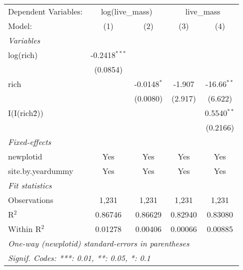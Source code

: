 \begin{tabular}{lcccc}
\tabularnewline\midrule\midrule
Dependent Variables:&\multicolumn{2}{c}{log(live\_mass)}&\multicolumn{2}{c}{live\_mass}\\
Model:&(1) & (2) & (3) & (4)\\
\midrule \emph{Variables}&   &   &   &  \\
log(rich)&-0.2418$^{***}$ &    &    &   \\
  &(0.0854) &    &    &   \\
rich&   & -0.0148$^{*}$ & -1.907 & -16.66$^{**}$\\
  &   & (0.0080) & (2.917) & (6.622)\\
I(I(rich\^2))&   &    &    & 0.5540$^{**}$\\
  &   &    &    & (0.2166)\\
\midrule \emph{Fixed-effects}&   &   &   &  \\
newplotid & Yes & Yes & Yes & Yes\\
site.by.yeardummy & Yes & Yes & Yes & Yes\\
\midrule \emph{Fit statistics}&  & & & \\
Observations & 1,231&1,231&1,231&1,231\\
R$^2$ & 0.86746&0.86629&0.82940&0.83080\\
Within R$^2$ & 0.01278&0.00406&0.00066&0.00885\\
\midrule\midrule\multicolumn{5}{l}{\emph{One-way (newplotid) standard-errors in parentheses}}\\
\multicolumn{5}{l}{\emph{Signif. Codes: ***: 0.01, **: 0.05, *: 0.1}}\\
\end{tabular}


